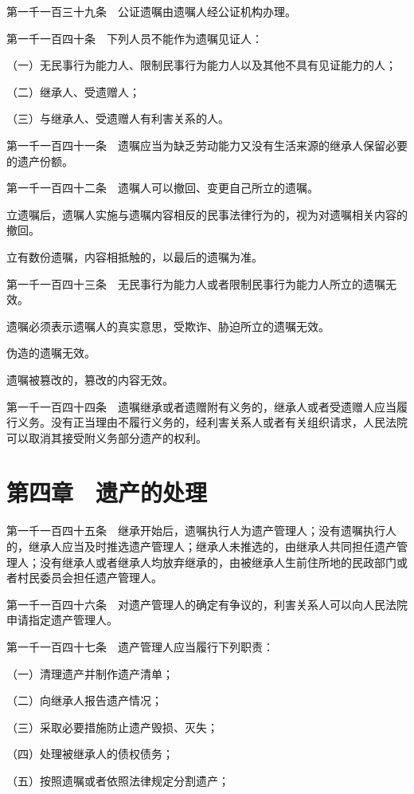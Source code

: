\documentclass[UTF8,12pt,a4paper]{ctexbook}
\begin{document}
第一千一百三十九条　公证遗嘱由遗嘱人经公证机构办理。

第一千一百四十条　下列人员不能作为遗嘱见证人：

（一）无民事行为能力人、限制民事行为能力人以及其他不具有见证能力的人；

（二）继承人、受遗赠人；

（三）与继承人、受遗赠人有利害关系的人。

第一千一百四十一条　遗嘱应当为缺乏劳动能力又没有生活来源的继承人保留必要的遗产份额。

第一千一百四十二条　遗嘱人可以撤回、变更自己所立的遗嘱。

立遗嘱后，遗嘱人实施与遗嘱内容相反的民事法律行为的，视为对遗嘱相关内容的撤回。

立有数份遗嘱，内容相抵触的，以最后的遗嘱为准。

第一千一百四十三条　无民事行为能力人或者限制民事行为能力人所立的遗嘱无效。

遗嘱必须表示遗嘱人的真实意思，受欺诈、胁迫所立的遗嘱无效。

伪造的遗嘱无效。

遗嘱被篡改的，篡改的内容无效。

第一千一百四十四条　遗嘱继承或者遗赠附有义务的，继承人或者受遗赠人应当履行义务。没有正当理由不履行义务的，经利害关系人或者有关组织请求，人民法院可以取消其接受附义务部分遗产的权利。

\section*{第四章　遗产的处理}

第一千一百四十五条　继承开始后，遗嘱执行人为遗产管理人；没有遗嘱执行人的，继承人应当及时推选遗产管理人；继承人未推选的，由继承人共同担任遗产管理人；没有继承人或者继承人均放弃继承的，由被继承人生前住所地的民政部门或者村民委员会担任遗产管理人。

第一千一百四十六条　对遗产管理人的确定有争议的，利害关系人可以向人民法院申请指定遗产管理人。

第一千一百四十七条　遗产管理人应当履行下列职责：

（一）清理遗产并制作遗产清单；

（二）向继承人报告遗产情况；

（三）采取必要措施防止遗产毁损、灭失；

（四）处理被继承人的债权债务；

（五）按照遗嘱或者依照法律规定分割遗产；
\end{document}
